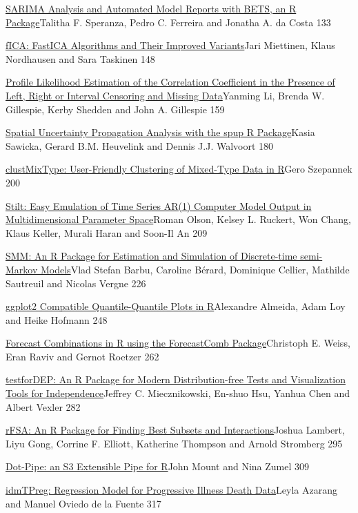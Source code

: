 \href{../../articles/RJ-2018-070}{SARIMA Analysis and Automated Model
Reports with BETS, an R Package}Talitha F. Speranza, Pedro C. Ferreira
and Jonatha A. da Costa 133

\href{../../articles/RJ-2018-046}{fICA: FastICA Algorithms and Their
Improved Variants}Jari Miettinen, Klaus Nordhausen and Sara Taskinen 148

\href{../../articles/RJ-2018-040}{Profile Likelihood Estimation of the
Correlation Coefficient in the Presence of Left, Right or Interval
Censoring and Missing Data}Yanming Li, Brenda W. Gillespie, Kerby
Shedden and John A. Gillespie 159

\href{../../articles/RJ-2018-047}{Spatial Uncertainty Propagation
Analysis with the spup R Package}Kasia Sawicka, Gerard B.M. Heuvelink
and Dennis J.J. Walvoort 180

\href{../../articles/RJ-2018-048}{clustMixType: User-Friendly Clustering
of Mixed-Type Data in R}Gero Szepannek 200

\href{../../articles/RJ-2018-049}{Stilt: Easy Emulation of Time Series
AR(1) Computer Model Output in Multidimensional Parameter Space}Roman
Olson, Kelsey L. Ruckert, Won Chang, Klaus Keller, Murali Haran and
Soon-Il An 209

\href{../../articles/RJ-2018-050}{SMM: An R Package for Estimation and
Simulation of Discrete-time semi-Markov Models}Vlad Stefan Barbu,
Caroline Bérard, Dominique Cellier, Mathilde Sautreuil and Nicolas
Vergne 226

\href{../../articles/RJ-2018-051}{ggplot2 Compatible Quantile-Quantile
Plots in R}Alexandre Almeida, Adam Loy and Heike Hofmann 248

\href{../../articles/RJ-2018-052}{Forecast Combinations in R using the
ForecastComb Package}Christoph E. Weiss, Eran Raviv and Gernot Roetzer
262

\href{../../articles/RJ-2018-057}{testforDEP: An R Package for Modern
Distribution-free Tests and Visualization Tools for Independence}Jeffrey
C. Miecznikowski, En-shuo Hsu, Yanhua Chen and Albert Vexler 282

\href{../../articles/RJ-2018-059}{rFSA: An R Package for Finding Best
Subsets and Interactions}Joshua Lambert, Liyu Gong, Corrine F. Elliott,
Katherine Thompson and Arnold Stromberg 295

\href{../../articles/RJ-2018-042}{Dot-Pipe: an S3 Extensible Pipe for
R}John Mount and Nina Zumel 309

\href{../../articles/RJ-2018-081}{idmTPreg: Regression Model for
Progressive Illness Death Data}Leyla Azarang and Manuel Oviedo de la
Fuente 317

